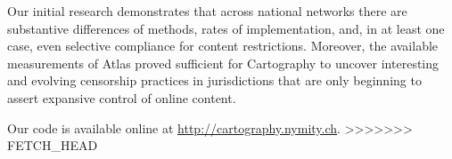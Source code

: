 Our initial research demonstrates that across national networks there are
substantive differences of methods, rates of implementation, and, in at least
one case, even selective compliance for content restrictions. Moreover, the
available measurements of Atlas proved sufficient for Cartography to uncover
interesting and evolving censorship practices in jurisdictions that are only
beginning to assert expansive control of online content.

Our code is available online at \url{http://cartography.nymity.ch}.
>>>>>>> FETCH_HEAD
